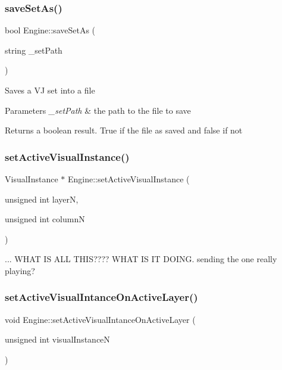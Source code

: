 \subsubsection{\texorpdfstring{save\+Set\+As()}{saveSetAs()}}
{\footnotesize\ttfamily bool Engine\+::save\+Set\+As (\begin{DoxyParamCaption}\item[{string}]{\+\_\+set\+Path }\end{DoxyParamCaption})}

Saves a VJ set into a file 
\begin{DoxyParams}{Parameters}
{\em \+\_\+set\+Path} & the path to the file to save \\
\hline
\end{DoxyParams}
\begin{DoxyReturn}{Returns}
a boolean result. True if the file as saved and false if not 
\end{DoxyReturn}
\mbox{\label{class_engine_a8527a1c21e96b85c113efac943f83039}} 
\subsubsection{\texorpdfstring{set\+Active\+Visual\+Instance()}{setActiveVisualInstance()}}
{\footnotesize\ttfamily Visual\+Instance $\ast$ Engine\+::set\+Active\+Visual\+Instance (\begin{DoxyParamCaption}\item[{unsigned int}]{layerN,  }\item[{unsigned int}]{columnN }\end{DoxyParamCaption})}

... W\+H\+AT IS A\+LL T\+H\+IS???? W\+H\+AT IS IT D\+O\+I\+NG. sending the one really playing? \mbox{\label{class_engine_a4800f622ab7b7125d70aea8c0426dbb3}} 
\subsubsection{\texorpdfstring{set\+Active\+Visual\+Intance\+On\+Active\+Layer()}{setActiveVisualIntanceOnActiveLayer()}}
{\footnotesize\ttfamily void Engine\+::set\+Active\+Visual\+Intance\+On\+Active\+Layer (\begin{DoxyParamCaption}\item[{unsigned int}]{visual\+InstanceN }\end{DoxyParamCaption})}

